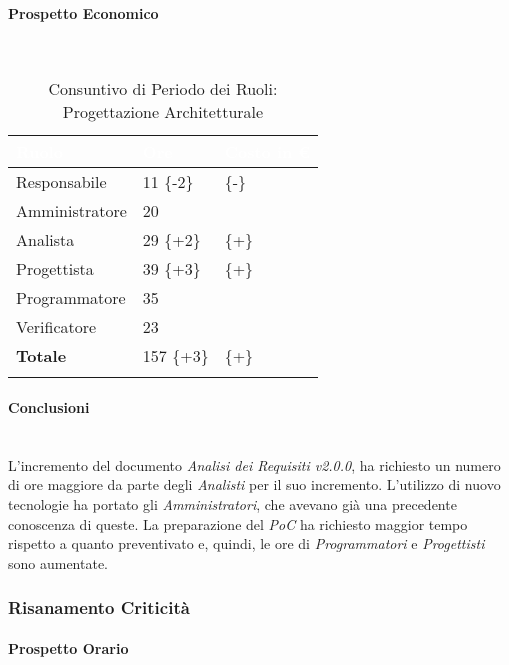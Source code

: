 \paragraph{Prospetto Economico} ~\\

\begin{longtable}{| C{.30\textwidth}| C{.15\textwidth}| C{.20\textwidth}|}
\hline
{}\textbf{\textcolor{white}{Ruolo}} & \textbf{\textcolor{white}{Ore}} & \textbf{\textcolor{white}{Costo in \euro}} \\
\hline 
Responsabile & 11 \{-2\}&  \{-\} \\
\hline
{}Amministratore & 20 &  \\
\hline
Analista & 29 \{+2\} &  \{+\}\\
\hline
{}Progettista & 39 \{+3\} &  \{+\}\\
\hline
Programmatore & 35 &  \\
\hline
{}Verificatore & 23 & \\
\hline
\textbf{Totale} & 157 \{+3\} &  \{+\}\\ 
\hline

\caption{Consuntivo di Periodo dei Ruoli: Progettazione Architetturale}
\label{Distribuzione oraria per ruoli del periodo di pa}
\end{longtable}

\paragraph{Conclusioni} ~\\
L'incremento del documento \textit{Analisi dei Requisiti v2.0.0}, ha richiesto un numero di ore maggiore da parte degli \textit{Analisti} per il suo incremento. L'utilizzo di nuovo tecnologie ha portato gli \textit{Amministratori}, che avevano già una precedente conoscenza di queste. La preparazione del \textit{PoC} ha richiesto maggior tempo rispetto a quanto preventivato e, quindi, le ore di \textit{Programmatori} e \textit{Progettisti} sono aumentate. 

\subsubsection{Risanamento Criticità}
\label{RA2}

\paragraph{Prospetto Orario} \-\\

